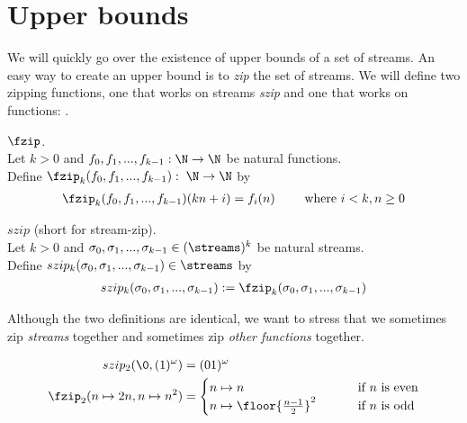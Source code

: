 \section{Upper bounds}
We will quickly go over the existence of upper bounds of a set of streams. An easy way to create an upper bound is to \textit{zip} the set of streams. We will define two zipping functions, one that works on streams \textit{szip} and one that works on functions: \textit{\fzip}.


\begin{definition}{$\fzip$.}\\
	Let $k>0$ and $f_0,f_1,...,f_{k-1} : \N \to \N$ be natural functions.\\
	Define $\fzip_k(f_0,f_1,...,f_{k-1}):\;\N \to \N$ by
	\begin{align}
		\fzip_k(f_0,f_1,...,f_{k-1})(kn+i) = f_i(n)
		\qquad\text{ where } i<k,n\geq 0 
	\end{align}
\end{definition}

\begin{definition}{$szip$ (short for stream-zip).}\label{generalized_function_zip}\\
	Let $k>0$ and $\sigma_0,\sigma_1,...,\sigma_{k-1} \in (\streams)^k$ be natural streams.\\
	Define $szip_k(\sigma_0,\sigma_1,...,\sigma_{k-1}) \in \streams$ by
	\begin{align}
		szip_k(\sigma_0,\sigma_1,...,\sigma_{k-1}) := \fzip_k(\sigma_0,\sigma_1,...,\sigma_{k-1})
	\end{align}
\end{definition}

Although the two definitions are identical, we want to stress that we sometimes zip \textit{streams} together and sometimes zip \textit{other functions} together.

\begin{example}
	\begin{align*}
		szip_2(\0,(1)^\omega) &= (01)^\omega \\
		\fzip_2(n \mapsto 2n, n \mapsto n^2) &= 
		\begin{cases}
			n \mapsto n &\qquad \text{ if } n \text{ is even} \\
			n \mapsto \floor{\frac{n-1}{2}}^2 &\qquad \text{ if } n \text{ is odd} 
		\end{cases}
	\end{align*}
\end{example}


